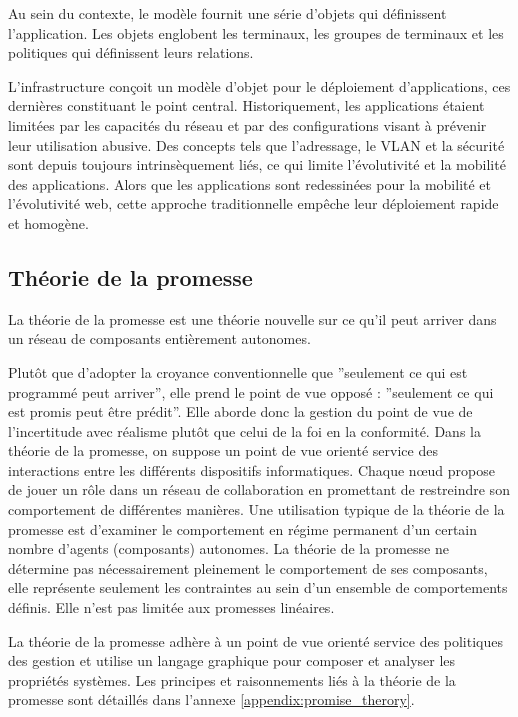 Au sein du contexte, le modèle fournit une série d'objets qui définissent
l'application. Les objets englobent les terminaux, les groupes de terminaux et
les politiques qui définissent leurs relations.

L'infrastructure conçoit un modèle d'objet pour le déploiement d'applications,
ces dernières constituant le point central. Historiquement, les applications
étaient limitées par les capacités du réseau et par des configurations visant à
prévenir leur utilisation abusive. Des concepts tels que l'adressage, le VLAN et
la sécurité sont depuis toujours intrinsèquement liés, ce qui limite
l'évolutivité et la mobilité des applications. Alors que les applications sont
redessinées pour la mobilité et l'évolutivité web, cette approche traditionnelle
empêche leur déploiement rapide et homogène.

\subsection{Théorie de la promesse}

La théorie de la promesse est une théorie nouvelle sur ce qu'il peut arriver
dans un réseau de composants entièrement autonomes.

Plutôt que d'adopter la croyance conventionnelle que ''seulement ce qui est
programmé peut arriver'', elle prend le point de vue opposé : ''seulement ce
qui est promis peut être prédit''. Elle aborde donc la gestion du point de vue
de l'incertitude avec réalisme plutôt que celui de la foi en la conformité. Dans
la théorie de la promesse, on suppose un point de vue orienté service des
interactions entre les différents dispositifs informatiques. Chaque nœud propose
de jouer un rôle dans un réseau de collaboration en promettant de restreindre
son comportement de différentes manières. Une utilisation typique de la théorie
de la promesse est d'examiner le comportement en régime permanent d'un certain
nombre d'agents (composants) autonomes. La théorie de la promesse ne détermine
pas nécessairement pleinement le comportement de ses composants, elle représente
seulement les contraintes au sein d'un ensemble de comportements définis. Elle
n'est pas limitée aux promesses linéaires.

La théorie de la promesse adhère à un point de vue orienté service des
politiques des gestion et utilise un langage graphique pour composer et analyser
les propriétés systèmes. Les principes et raisonnements liés à la théorie de la
promesse sont détaillés dans l'annexe \ref{appendix:promise_therory}.

